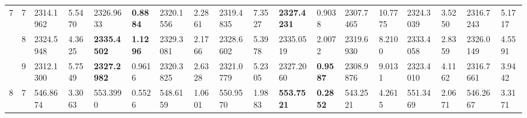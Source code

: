 \documentclass[conference]{IEEEtran}
\begin{document}
\begin{table*}[]
\begin{tabular}{|cc|ll|ll|ll|ll|ll|ll|ll|ll|}
		\multicolumn{1}{|c|}{\multirow{3}{*}{7}}          & 7                               & \multicolumn{1}{l|}{2314.1962}         & 5.5470                            & \multicolumn{1}{l|}{2326.9633}          & \textbf{0.8884}                   & \multicolumn{1}{l|}{2320.1556}         & 2.2861                            & \multicolumn{1}{l|}{2319.4835}         & 7.3527                            & \multicolumn{1}{l|}{\textbf{2327.4231}} & 0.9038                            & \multicolumn{1}{l|}{2307.7465}         & 10.7775                           & \multicolumn{1}{l|}{2324.3039}         & 3.5250                            & \multicolumn{1}{l|}{2316.7243}         & 5.1717                            \\ \cline{2-18} 
		\multicolumn{1}{|c|}{}                            & 8                               & \multicolumn{1}{l|}{2324.5948}         & 4.3625                            & \multicolumn{1}{l|}{\textbf{2335.4502}} & \textbf{1.1296}                   & \multicolumn{1}{l|}{2329.3081}         & 2.1766                            & \multicolumn{1}{l|}{2328.6602}         & 5.3978                            & \multicolumn{1}{l|}{2335.0519}          & 2.0072                            & \multicolumn{1}{l|}{2319.6930}         & 8.2100                            & \multicolumn{1}{l|}{2333.4058}         & 2.8359                            & \multicolumn{1}{l|}{2326.0149}         & 4.5591                            \\ \cline{2-18} 
		\multicolumn{1}{|c|}{}                            & 9                               & \multicolumn{1}{l|}{2312.1300}         & 5.7549                            & \multicolumn{1}{l|}{\textbf{2327.2982}} & 0.9616                            & \multicolumn{1}{l|}{2320.3825}         & 2.6328                            & \multicolumn{1}{l|}{2321.0779}         & 5.2305                            & \multicolumn{1}{l|}{2327.2060}          & \textbf{0.9587}                   & \multicolumn{1}{l|}{2308.9876}         & 9.0131                            & \multicolumn{1}{l|}{2323.4010}         & 4.1162                            & \multicolumn{1}{l|}{2316.7661}         & 3.9442                            \\ \hline
		\multicolumn{1}{|c|}{\multirow{3}{*}{8}}          & 7                               & \multicolumn{1}{l|}{546.8674}          & 3.3063                            & \multicolumn{1}{l|}{553.3990}           & 0.5526                            & \multicolumn{1}{l|}{548.6159}          & 1.0601                            & \multicolumn{1}{l|}{550.9570}          & 1.9883                            & \multicolumn{1}{l|}{\textbf{553.7521}}  & \textbf{0.2852}                   & \multicolumn{1}{l|}{543.2521}          & 4.2615                            & \multicolumn{1}{l|}{551.3469}          & 2.0671                            & \multicolumn{1}{l|}{546.2667}          & 3.3171                            \\ \cline{2-18} 

\end{tabular}
\end{table*}
\end{document}

